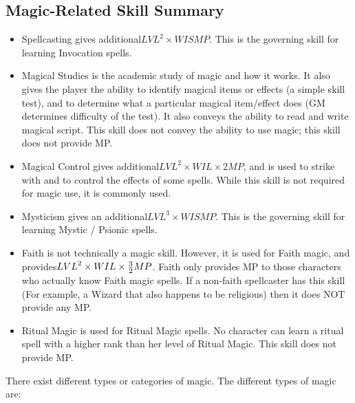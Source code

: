 \documentclass[twoside]{book}
\begin{document}
    

\subsection{Magic-Related Skill Summary}
    
\begin{itemize}
      
  \item Spellcasting gives additional\begin{math}{LVL}^{2}\times WISMP\end{math}. This is the governing skill for learning Invocation spells.
  \item Magical Studies is the academic study of magic and how it works. It also gives the player the ability to identify magical items or effects (a simple skill test), and to determine what a particular magical item/effect does (GM determines difficulty of the test). It also conveys the ability to read and write magical script. This skill does not convey the ability to use magic; this skill does not provide MP.
  \item Magical Control gives additional\begin{math}{LVL}^{2}\times WIL\times 2MP\end{math}, and is used to strike with and to control the effects of some spells. While this skill is not required for magic use, it is commonly used.
  \item Mysticism gives an additional\begin{math}{LVL}^{3}\times WISMP\end{math}. This is the governing skill for learning Mystic / Psionic spells.
  \item Faith is not technically a magic skill. However, it is used for Faith magic, and provides\begin{math}{LVL}^{2}\times WIL\times {{3}\over{2}}MP\end{math}. Faith only provides MP to those characters who actually know Faith magic spells. If a non-faith spellcaster has this skill (For example, a Wizard that also happens to be religious) then it does NOT provide any MP.
  \item Ritual Magic is used for Ritual Magic spells. No character can learn a ritual spell with a higher rank than her level of Ritual Magic. This skill does not provide MP.
\end{itemize}
  
    {  
    There exist different types or categories of magic. The different types of magic are:
    }
  
\end{document}
